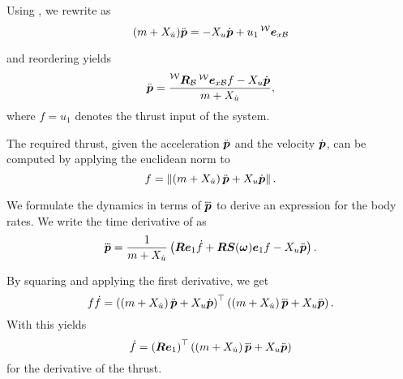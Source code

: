 Using , we rewrite  as
\begin{equation}
	(m+X_{\dot{u}})\mbox{$\ddot{\bm{p}}$}
	=
	-X_u \mbox{$\dot{\bm{p}}$}
	+ u_1\prescript{\mathcal{W}}{}{\mbox{$\bm{e}$}}_{x\mathcal{B}}
\end{equation}

and reordering yields
\begin{equation}
	\label{eq:trajectory-acceleration-eom}
	\pbpp = \frac{\Rbodyworld \exbodyinworld f - X_u \pbp}{m + X_{\dot{u}}},
\end{equation}
where $f=u_1$ denotes the thrust input of the system.

The required thrust, given the acceleration $\mbox{$\ddot{\bm{p}}$}$ and the velocity $\mbox{$\dot{\bm{p}}$}$, can be computed by applying the euclidean norm to 
\begin{equation}
	\label{eq:trajectory-thrust}
	f =
	\left\lVert
	\left(m + X_{\dot{u}}\right) \mbox{$\ddot{\bm{p}}$} + X_u \mbox{$\dot{\bm{p}}$}
	\right\rVert.
\end{equation}

We formulate the dynamics in terms of $\mbox{$\dddot{\bm{p}}$}$ to derive an expression for the body rates.
We write the time derivative of  as
\begin{equation}
	\label{eq:jerk}
	\mbox{$\dddot{\bm{p}}$} = 
	\frac{1}{m + X_{\dot{u}}}
	\left(
		\mbox{$\bm{R}$} \mbox{$\bm{e}$}_1 \mbox{$\dot{f}$} 
		+ \mbox{$\bm{R}$} \mbox{$\bm{S}$}(\mbox{$\bm{\omega}$})\mbox{$\bm{e}$}_1 f
		- X_u \mbox{$\ddot{\bm{p}}$}
	\right)
	.
\end{equation}

By squaring  and applying the first derivative, we get
\begin{equation}
	f\mbox{$\dot{f}$} = 
	\left(
		\left(m + X_{\dot{u}}\right) \mbox{$\ddot{\bm{p}}$}
		+ X_u \mbox{$\dot{\bm{p}}$}
	\right)^\top
	\left(
		\left(m + X_{\dot{u}}\right) \mbox{$\dddot{\bm{p}}$}
		+ X_u \mbox{$\ddot{\bm{p}}$}
	\right).
\end{equation}
With  this yields
\begin{equation}
	\label{eq:fdot}
	\mbox{$\dot{f}$} = \left(\mbox{$\bm{R}$} \mbox{$\bm{e}$}_1\right)^\top
	\left(
		\left(m + X_{\dot{u}}\right) \mbox{$\dddot{\bm{p}}$}
		+ X_u \mbox{$\ddot{\bm{p}}$}
	\right)
\end{equation}
for the derivative of the thrust.

